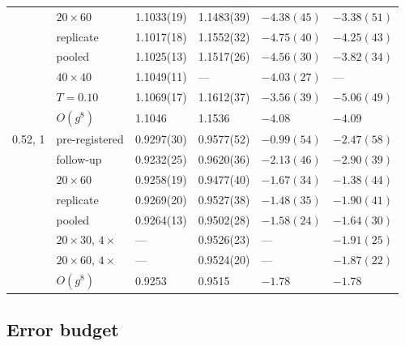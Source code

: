 \documentclass[aps,prb,twocolumn,superscriptaddress,floatfix]{revtex4-2}
\begin{document}
\begin{table}
\begin{ruledtabular}
\begin{tabular}{llllll}
     & $20\times60$ & 1.1033(19) & 1.1483(39) & $-4.38(45)$ & $-3.38(51)$ \\
     & replicate & 1.1017(18) & 1.1552(32) & $-4.75(40)$ & $-4.25(43)$ \\
     & pooled & 1.1025(13) & 1.1517(26) & $-4.56(30)$ & $-3.82(34)$ \\
     & $40\times40$ & 1.1049(11) & --- & $-4.03(27)$ & --- \\
     & $T=0.10$ & 1.1069(17) & 1.1612(37) & $-3.56(39)$ & $-5.06(49)$ \\
     & $O(g^8)$ & 1.1046 & 1.1536 & $-4.08$ & $-4.09$ \\
0.52, 1 & pre-registered & 0.9297(30) & 0.9577(52) & $-0.99(54)$ & $-2.47(58)$ \\
     & follow-up & 0.9232(25) & 0.9620(36) & $-2.13(46)$ & $-2.90(39)$ \\
     & $20\times60$ & 0.9258(19) & 0.9477(40) & $-1.67(34)$ & $-1.38(44)$ \\
     & replicate & 0.9269(20) & 0.9527(38) & $-1.48(35)$ & $-1.90(41)$ \\
     & pooled & 0.9264(13) & 0.9502(28) & $-1.58(24)$ & $-1.64(30)$ \\
     & $20\times30$, $4\times$ & --- & 0.9526(23) & --- & $-1.91(25)$ \\
     & $20\times60$, $4\times$ & --- & 0.9524(20) & --- & $-1.87(22)$ \\
     & $O(g^8)$ & 0.9253 & 0.9515 & $-1.78$ & $-1.78$ \\
\end{tabular}
\end{ruledtabular}
\end{table}

\subsection{Error budget}
\end{document}

